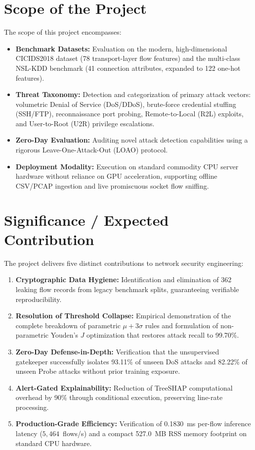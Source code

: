 \documentclass[12pt,a4paper]{report}
\begin{document}
\section{Scope of the Project}
The scope of this project encompasses:
\begin{itemize}
    \item \textbf{Benchmark Datasets:} Evaluation on the modern, high-dimensional CICIDS2018 dataset (78 transport-layer flow features) and the multi-class NSL-KDD benchmark (41 connection attributes, expanded to 122 one-hot features).
    \item \textbf{Threat Taxonomy:} Detection and categorization of primary attack vectors: volumetric Denial of Service (DoS/DDoS), brute-force credential stuffing (SSH/FTP), reconnaissance port probing, Remote-to-Local (R2L) exploits, and User-to-Root (U2R) privilege escalations.
    \item \textbf{Zero-Day Evaluation:} Auditing novel attack detection capabilities using a rigorous Leave-One-Attack-Out (LOAO) protocol.
    \item \textbf{Deployment Modality:} Execution on standard commodity CPU server hardware without reliance on GPU acceleration, supporting offline CSV/PCAP ingestion and live promiscuous socket flow sniffing.
\end{itemize}

\section{Significance / Expected Contribution}
The project delivers five distinct contributions to network security engineering:
\begin{enumerate}
    \item \textbf{Cryptographic Data Hygiene:} Identification and elimination of 362 leaking flow records from legacy benchmark splits, guaranteeing verifiable reproducibility.
    \item \textbf{Resolution of Threshold Collapse:} Empirical demonstration of the complete breakdown of parametric $\mu + 3\sigma$ rules and formulation of non-parametric Youden's $J$ optimization that restores attack recall to 99.70\%.
    \item \textbf{Zero-Day Defense-in-Depth:} Verification that the unsupervised gatekeeper successfully isolates 93.11\% of unseen DoS attacks and 82.22\% of unseen Probe attacks without prior training exposure.
    \item \textbf{Alert-Gated Explainability:} Reduction of TreeSHAP computational overhead by 90\% through conditional execution, preserving line-rate processing.
    \item \textbf{Production-Grade Efficiency:} Verification of 0.1830~ms per-flow inference latency ($5{,}464$~flows/s) and a compact 527.0~MB RSS memory footprint on standard CPU hardware.
\end{enumerate}
\end{document}
